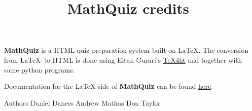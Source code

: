 \documentclass{mathquiz}
\title{MathQuiz credits}
\begin{document}
\begin{discussion}[Credits]
    \textbf{MathQuiz} is a HTML quiz preparation system built on
    \LaTeX. The conversion from \LaTeX\ to HTML is done using Eitan
    Gurari's
  \href{http://www.cis.ohio-state.edu/~gurari/TeX4ht/mn.html}{TeX4ht}
    and together with some python programs.

    Documentation
    for the \LaTeX{} side of \textbf{MathQuiz} can be found
    \href{http://www.maths.usyd.edu.au:8000/u/MOW/MathQuiz/doc/mathquiz-manual.html}{here}.

    Authors
     \qquad   Daniel Daners\newline
     \qquad   Andrew Mathas\newline
     \qquad   Don Taylor
\end{discussion}
\end{document}
